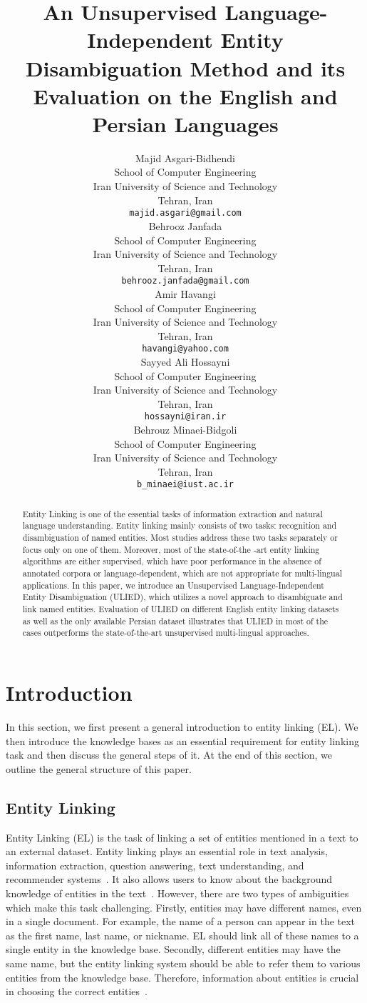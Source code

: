 \documentclass{article}
\title{An Unsupervised Language-Independent Entity Disambiguation Method and its Evaluation on the English and Persian Languages}
\author{
    Majid Asgari-Bidhendi\\
    School of Computer Engineering\\
    Iran University of Science and Technology\\
    Tehran, Iran\\
    \texttt{majid.asgari@gmail.com}\\
    \And
    Behrooz Janfada\\
    School of Computer Engineering\\
    Iran University of Science and Technology\\
    Tehran, Iran\\
    \texttt{behrooz.janfada@gmail.com}\\
    \And
    Amir Havangi\\
    School of Computer Engineering\\
    Iran University of Science and Technology\\
    Tehran, Iran\\
    \texttt{havangi@yahoo.com}\\
    \And
    Sayyed Ali Hossayni\\
    School of Computer Engineering\\
    Iran University of Science and Technology\\
    Tehran, Iran\\
    \texttt{hossayni@iran.ir}\\
    \And
    Behrouz Minaei-Bidgoli\\
    School of Computer Engineering\\
    Iran University of Science and Technology\\
    Tehran, Iran\\
    \texttt{b\_minaei@iust.ac.ir}\\
}
\begin{document}
\maketitle

\begin{abstract}
Entity Linking is one of the essential tasks of information extraction and natural language understanding. Entity linking mainly consists of two tasks: recognition and disambiguation of named entities. Most studies address these two tasks separately or focus only on one of them. Moreover, most of the state-of-the -art entity linking algorithms are either supervised, which have poor performance in the absence of annotated corpora or language-dependent, which are not appropriate for multi-lingual applications. In this paper, we introduce an Unsupervised Language-Independent Entity Disambiguation (ULIED), which utilizes a novel approach to disambiguate and link named entities. Evaluation of ULIED on different English entity linking datasets as well as the only available Persian dataset illustrates that ULIED in most of the cases outperforms the state-of-the-art unsupervised multi-lingual approaches.
\end{abstract}


\section{Introduction}
\label{sec:intro}
In this section, we first present a general introduction to entity linking (EL). We then introduce the knowledge bases as an essential requirement for entity linking task and then discuss the general steps of it. At the end of this section, we outline the general structure of this paper.
\subsection{Entity Linking}
Entity Linking (EL) is the task of linking a set of entities mentioned in a text to an external dataset. Entity linking plays an essential role in text analysis, information extraction, question answering, text understanding, and recommender systems~\cite{yan2017entity}. It also allows users to know about the background knowledge of entities in the text~\cite{han2011collective}. However, there are two types of ambiguities which make this task challenging. Firstly, entities may have different names, even in a single document. For example, the name of a person can appear in the text as the first name, last name, or nickname.
EL should link all of these names to a single entity in the knowledge base. Secondly, different entities may have the same name, but the entity linking system should be able to refer them to various entities from the knowledge base. Therefore, information about entities is crucial in choosing the correct entities~\cite{ganea2016probabilistic,han2011collective,shen2014entity}.
\end{document}
